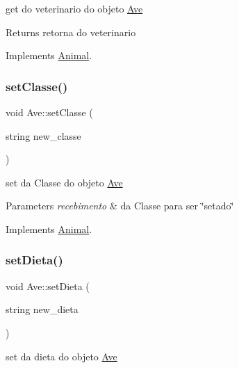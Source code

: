get do veterinario do objeto \mbox{\hyperlink{class_ave}{Ave}} 

\begin{DoxyReturn}{Returns}
retorna do veterinario 
\end{DoxyReturn}


Implements \mbox{\hyperlink{class_animal}{Animal}}.

\mbox{\label{class_ave_a4d79bb3cbee243b1e4542b00eb71ce71}} 
\subsubsection{\texorpdfstring{setClasse()}{setClasse()}}
{\footnotesize\ttfamily void Ave\+::set\+Classe (\begin{DoxyParamCaption}\item[{string}]{new\+\_\+classe }\end{DoxyParamCaption})\hspace{0.3cm}{\ttfamily [virtual]}}



set da Classe do objeto \mbox{\hyperlink{class_ave}{Ave}} 


\begin{DoxyParams}{Parameters}
{\em recebimento} & da Classe para ser \char`\"{}setado\char`\"{} \\
\hline
\end{DoxyParams}


Implements \mbox{\hyperlink{class_animal}{Animal}}.

\mbox{\label{class_ave_ad829e2e77d0dc757d29c2c7a21141658}} 
\subsubsection{\texorpdfstring{setDieta()}{setDieta()}}
{\footnotesize\ttfamily void Ave\+::set\+Dieta (\begin{DoxyParamCaption}\item[{string}]{new\+\_\+dieta }\end{DoxyParamCaption})\hspace{0.3cm}{\ttfamily [virtual]}}



set da dieta do objeto \mbox{\hyperlink{class_ave}{Ave}} 


